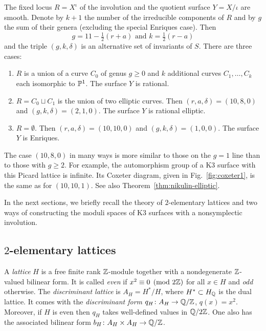 \documentclass{amsart}
\begin{document}
The fixed locus $R=X^\iota$ of the involution and the quotient
surface $Y=X/\iota$ are smooth. Denote by $k+1$ the number of the
irreducible components of $R$ and by $g$ the sum of their genera
(excluding the special Enriques case). Then
\begin{equation}\label{eq:g-k}
  g = 11 - \tfrac12 (r+a) \text{ and } k = \tfrac12 (r-a)
\end{equation}
and the triple $(g,k,\delta)$ is an alternative set of invariants of
$S$. There are three cases:
\begin{enumerate}
\item $R$ is a union of a curve $C_0$ of genus $g\ge0$ and $k$
  additional curves $C_1,\dotsc,C_k$ each isomorphic to ${\mathbb P}^1$.
  The surface $Y$ is rational. \vspace{1pt}
\item $R=C_0\sqcup C_1$ is the union of two elliptic curves. Then
  $(r,a,\delta)=(10,8,0)$ and $(g,k,\delta) = (2,1,0)$.
  The surface $Y$ is rational elliptic. \vspace{1pt}
\item $R=\emptyset$. Then $(r,a,\delta)=(10,10,0)$ and
  $(g,k,\delta)=(1,0,0)$. The surface $Y$ is Enriques.
\end{enumerate}

\begin{remark}\label{rem:10-8-0}
  The case $(10,8,0)$ in many ways is more similar to those on the
  $g=1$ line than to those with $g\ge2$. For example, the automorphism
  group of a K3 surface with this Picard lattice is infinite.  Its
  Coxeter diagram, given in Fig.~\ref{fig:coxeter1}, is the same as
  for $(10,10,1)$.  See also Theorem~\ref{thm:nikulin-elliptic}.
\end{remark}

In the next sections, we briefly recall the theory of $2$-elementary
lattices and two ways of constructing the moduli spaces of K3 surfaces
with a nonsymplectic involution.


\subsection{$2$-elementary lattices}
\label{sec:2-elem-lattices}

 A \emph{lattice} $H$ is a free finite
rank ${\mathbb Z}$-module together with a nondegenerate ${\mathbb Z}$-valued bilinear
form. It is called \emph{even} if $x^2\equiv 0\pmod {2{\mathbb Z}}$ for all $x\in H$ and
\emph{odd} otherwise. The \emph{discriminant lattice} is $A_H = H^*/H$, where
$H^*\subset H_{\mathbb Q}$ is the dual lattice. It comes with the \emph{discriminant
  form} $q_H\colon A_H\to {\mathbb Q}/{\mathbb Z}$, $q(x) = x^2$. Moreover, if $H$ is
even then $q_H$ takes well-defined values in ${\mathbb Q}/2{\mathbb Z}$. One also has the
associated bilinear form $b_H\colon A_H\times A_H\to {\mathbb Q}/{\mathbb Z}$.
\end{document}
